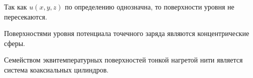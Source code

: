     \begin{figure}[h]
        \center
        \begin{minipage}[h]{0.49\textwidth}
        \end{minipage}
        \hfill
        \begin{minipage}[h]{0.49\textwidth}
        \end{minipage}
        \end{figure}

    \begin{remark}
        Так как \( u(x,y,z) \) по определению однозначна, то поверхности уровня не пересекаются.
    \end{remark}

    \begin{example}
        Поверхностями уровня потенциала точечного заряда являются концентрические сферы.
    \end{example}

    \begin{example}
        Семейством эквитемпературных поверхностей тонкой нагретой нити является система коаксиальных цилиндров.
    \end{example}

